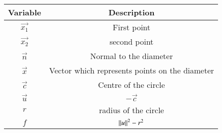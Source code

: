 \begin{tabular}[12pt]{ |c|c|}
    \hline
    \textbf{Variable} & \textbf{Description}\\ 
    \hline
    $\vec{x_1}$ & First point\\
    \hline
    $\vec{x_2}$ & second point\\
    \hline
    $\vec{n}$ & Normal to the diameter\\
    \hline
    $\vec{x}$ & Vector which represents points on the diameter\\
    \hline
    $\vec{c}$ & Centre of the circle\\
    \hline
    $\vec{u}$ & $-\vec{c}$\\
    \hline
    $r$ & radius of the circle\\
    \hline
    $f$ & $\left\lVert u\right\rVert^2-r^2$\\
    \hline
    \end{tabular}
